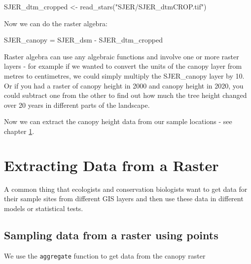 \documentclass[
]{book}
\newenvironment{Shaded}{\begin{snugshade}}{\end{snugshade}}
\newcommand{\AttributeTok}[1]{\textcolor[rgb]{0.77,0.63,0.00}{#1}}
\newcommand{\ConstantTok}[1]{\textcolor[rgb]{0.00,0.00,0.00}{#1}}
\newcommand{\FunctionTok}[1]{\textcolor[rgb]{0.00,0.00,0.00}{#1}}
\newcommand{\NormalTok}[1]{#1}
\newcommand{\OtherTok}[1]{\textcolor[rgb]{0.56,0.35,0.01}{#1}}
\newcommand{\SpecialCharTok}[1]{\textcolor[rgb]{0.00,0.00,0.00}{#1}}
\newcommand{\StringTok}[1]{\textcolor[rgb]{0.31,0.60,0.02}{#1}}
\begin{document}
\begin{Shaded}
\begin{Highlighting}[]
\NormalTok{SJER\_dtm\_cropped }\OtherTok{\textless{}{-}} \FunctionTok{read\_stars}\NormalTok{(}\StringTok{"SJER/SJER\_dtmCROP.tif"}\NormalTok{)}
\end{Highlighting}
\end{Shaded}

Now we can do the raster algebra:

\begin{Shaded}
\begin{Highlighting}[]
\NormalTok{SJER\_canopy }\OtherTok{=}\NormalTok{ SJER\_dsm }\SpecialCharTok{{-}}\NormalTok{ SJER\_dtm\_cropped}
\end{Highlighting}
\end{Shaded}

Raster algebra can use any algebraic functions and involve one or more raster layers - for example if we wanted to convert the units of the canopy layer from metres to centimetres, we could simply multiply the SJER\_canopy layer by 10. Or if you had a raster of canopy height in 2000 and canopy height in 2020, you could subtract one from the other to find out how much the tree height changed over 20 years in different parts of the landscape.

Now we can extract the canopy height data from our sample locations - see chapter \ref{extractingData}.

\hypertarget{extractingData}{%
\chapter{Extracting Data from a Raster}\label{extractingData}}

A common thing that ecologists and conservation biologists want to get data for their sample sites from different GIS layers and then use these data in different models or statistical tests.

\hypertarget{sampling-data-from-a-raster-using-points}{%
\section{Sampling data from a raster using points}\label{sampling-data-from-a-raster-using-points}}

We use the \texttt{aggregate} function to get data from the canopy raster

\begin{Shaded}
\end{Shaded}
\end{document}
